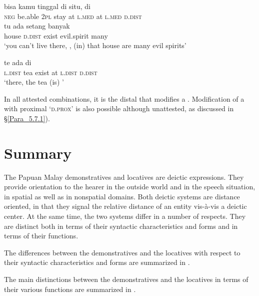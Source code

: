 {\ea
\label{Example_7.65}
 {{bisa}} {{kamu}} {{tinggal}} {{di}} {situ,} {di} {} {}\\ %
 \textsc{neg}  {be.able}  {\textsc{2pl}}  {stay}  {at}  \textsc{l.med}  at  \textsc{l.med}  \textsc{d.dist}\\
  {tu}  {ada}  {setang}  {banyak}\\
 {house}  {\textsc{d.dist}}  {exist}  {evil.spirit}  {many}\\
\glt 
‘you can’t live there, \bluebold{)}, (in) that house are many evil spirits’ \textstyleExampleSource{[081006-022-CvEx.0164]}
\z

\ea
\label{Example_7.66}
 {te} {ada} {di} {} {}\\ %
 \textsc{l.dist}  tea  exist  at  \textsc{l.dist}  \textsc{d.dist}\\
\glt 
‘there, the tea (is) \bluebold{)}’ \textstyleExampleSource{[081014-011-CvEx.0010]}
\z


In all attested combinations, it is the distal  that modifies a . Modification of a  with proximal  ‘\textsc{d.prox}’ is also possible although unattested, as discussed in §\ref{Para_5.7.1}).


\section{Summary}
\label{Para_7.4}
The Papuan Malay demonstratives and locatives are deictic expressions. They provide orientation to the hearer in the outside world and in the speech situation, in spatial as well as in nonspatial domains. Both deictic systems are distance oriented, in that they signal the relative distance of an entity vis-à-vis a deictic center. At the same time, the two systems differ in a number of respects. They are distinct both in terms of their syntactic characteristics and forms and in terms of their functions.



The differences between the demonstratives and the locatives with respect to their syntactic characteristics and forms are summarized in .

The main distinctions between the demonstratives and the locatives in terms of their various functions are summarized in .

}
